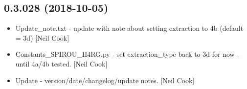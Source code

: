 \documentclass[a4paper,10pt,english]{report}
\begin{document}
\subsection{0.3.028 (2018-10-05)}
\label{\detokenize{misc/changelog:id302}}\begin{itemize}
\item {} 
Update\_note.txt - update with note about setting extraction to 4b
(default = 3d) {[}Neil Cook{]}

\item {} 
Constants\_SPIROU\_H4RG.py - set extraction\_type back to 3d for now -
until 4a/4b tested. {[}Neil Cook{]}

\item {} 
Update - version/date/changelog/update notes. {[}Neil Cook{]}

\end{itemize}
\end{document}

